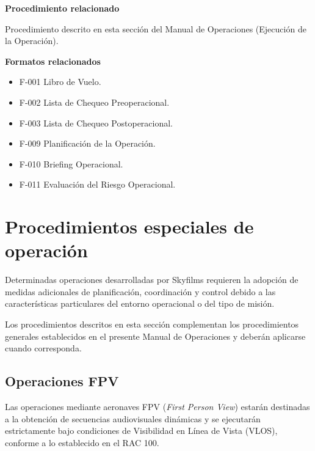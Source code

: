\begin{tcolorbox}[title=Documentos asociados,colback=gray!5,colframe=black]

\textbf{Procedimiento relacionado}

Procedimiento descrito en esta sección del Manual de Operaciones (Ejecución de la Operación).

\vspace{0.3cm}

\textbf{Formatos relacionados}

\begin{itemize}

\item F-001 Libro de Vuelo.

\item F-002 Lista de Chequeo Preoperacional.

\item F-003 Lista de Chequeo Postoperacional.

\item F-009 Planificación de la Operación.

\item F-010 Briefing Operacional.

\item F-011 Evaluación del Riesgo Operacional.

\end{itemize}

\end{tcolorbox}

\section{Procedimientos especiales de operación}

Determinadas operaciones desarrolladas por Skyfilms requieren la adopción de medidas adicionales de planificación, coordinación y control debido a las características particulares del entorno operacional o del tipo de misión.

Los procedimientos descritos en esta sección complementan los procedimientos generales establecidos en el presente Manual de Operaciones y deberán aplicarse cuando corresponda.


\subsection{Operaciones FPV}

Las operaciones mediante aeronaves FPV (\textit{First Person View}) estarán destinadas a la obtención de secuencias audiovisuales dinámicas y se ejecutarán estrictamente bajo condiciones de Visibilidad en Línea de Vista (VLOS), conforme a lo establecido en el RAC 100.

